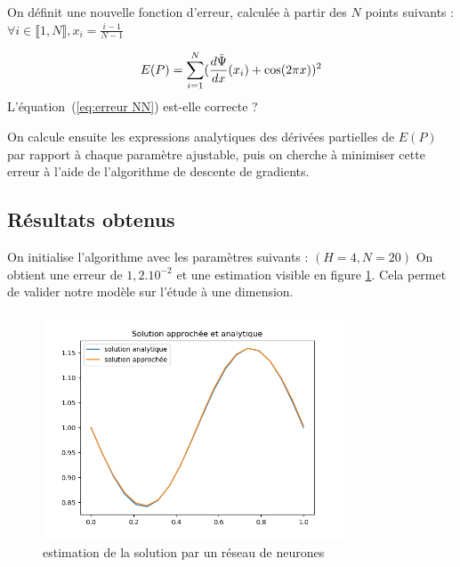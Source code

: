 \documentclass[12pt]{report}
\begin{document}
On définit une nouvelle fonction d'erreur, calculée à partir des $N$ points suivants : $\forall i \in\llbracket 1,N \rrbracket, x_i = \frac{i-1}{N-1} $ 

\begin{equation}
        E(P) = \sum_{i=1}^{N} (\frac{d\Tilde{\Psi}}{dx}(x_i) + \cos(2\pi x))^2
\label{eq:erreur NN}
\end{equation}
{\color{red}L'équation~(\ref{eq:erreur NN}) est-elle correcte ?}

On calcule ensuite les expressions analytiques des dérivées partielles de $E(P)$ par rapport à chaque paramètre ajustable, puis on cherche à minimiser cette erreur à l'aide de l'algorithme de descente de gradients.

\subsection{Résultats obtenus}
On initialise l'algorithme avec les paramètres suivants :
$(H=4, N=20)$
On obtient une erreur de $1,2.10^{-2}$ et une estimation visible en figure \ref{fig:resultat_NN}. Cela permet de valider notre modèle sur l'étude à une dimension.

\begin{figure}
\centering
\includegraphics[width=0.8\textwidth]{resultat_NN.png}
\caption{\label{fig:resultat_NN}estimation de la solution par un réseau de neurones}
\end{figure}
\end{document}
